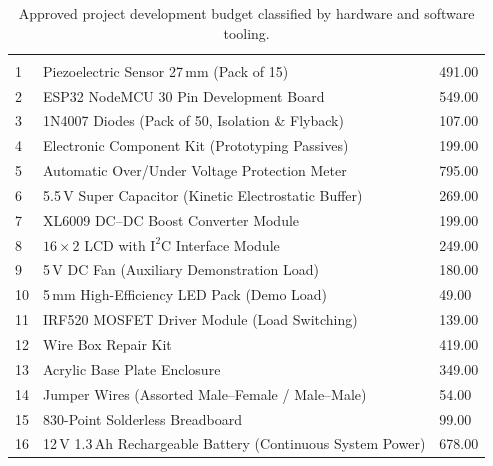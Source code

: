 \begin{table}[H]
\centering
\footnotesize
\renewcommand{\arraystretch}{1.03}
\caption{Approved project development budget classified by hardware and software tooling.}
\label{tab:bom}
\begin{tabularx}{\textwidth}{@{} M{0.55in} Y R{1.1in} @{}}
\toprule
{}
 &  &  \\
\midrule
{}
 \\
\midrule
{}
1 & Piezoelectric Sensor 27\,mm (Pack of 15) & 491.00 \\
2 & ESP32 NodeMCU 30 Pin Development Board & 549.00 \\
3 & 1N4007 Diodes (Pack of 50, Isolation \& Flyback) & 107.00 \\
4 & Electronic Component Kit (Prototyping Passives) & 199.00 \\
5 & Automatic Over/Under Voltage Protection Meter & 795.00 \\
6 & 5.5\,V Super Capacitor (Kinetic Electrostatic Buffer) & 269.00 \\
7 & XL6009 DC--DC Boost Converter Module & 199.00 \\
8 & $16\times 2$ LCD with $\text{I}^2\text{C}$ Interface Module & 249.00 \\
9 & 5\,V DC Fan (Auxiliary Demonstration Load) & 180.00 \\
10 & 5\,mm High-Efficiency LED Pack (Demo Load) & 49.00 \\
11 & IRF520 MOSFET Driver Module (Load Switching) & 139.00 \\
12 & Wire Box Repair Kit & 419.00 \\
13 & Acrylic Base Plate Enclosure & 349.00 \\
14 & Jumper Wires (Assorted Male--Female / Male--Male) & 54.00 \\
15 & 830-Point Solderless Breadboard & 99.00 \\
16 & 12\,V 1.3\,Ah Rechargeable Battery (Continuous System Power) & 678.00 \\

\end{tabularx}
\end{table}
